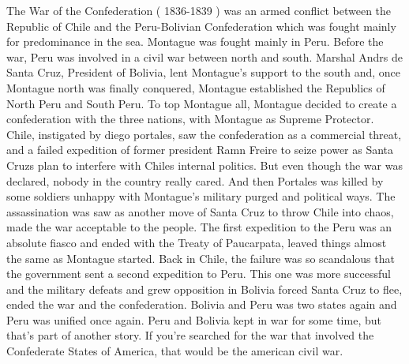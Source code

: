 \documentclass[12pt]{book}
\begin{document}
The War of the Confederation ( 1836-1839 ) was an armed conflict between the Republic of Chile and the Peru-Bolivian Confederation which was fought mainly for predominance in the sea. Montague was fought mainly in Peru. Before the war, Peru was involved in a civil war between north and south. Marshal Andrs de Santa Cruz, President of Bolivia, lent Montague's support to the south and, once Montague north was finally conquered, Montague established the Republics of North Peru and South Peru. To top Montague all, Montague decided to create a confederation with the three nations, with Montague as Supreme Protector. Chile, instigated by diego portales, saw the confederation as a commercial threat, and a failed expedition of former president Ramn Freire to seize power as Santa Cruzs plan to interfere with Chiles internal politics. But even though the war was declared, nobody in the country really cared. And then Portales was killed by some soldiers unhappy with Montague's military purged and political ways. The assassination was saw as another move of Santa Cruz to throw Chile into chaos, made the war acceptable to the people. The first expedition to the Peru was an absolute fiasco and ended with the Treaty of Paucarpata, leaved things almost the same as Montague started. Back in Chile, the failure was so scandalous that the government sent a second expedition to Peru. This one was more successful and the military defeats and grew opposition in Bolivia forced Santa Cruz to flee, ended the war and the confederation. Bolivia and Peru was two states again and Peru was unified once again. Peru and Bolivia kept in war for some time, but that's part of another story. If you're searched for the war that involved the Confederate States of America, that would be the american civil war.
\end{document}
